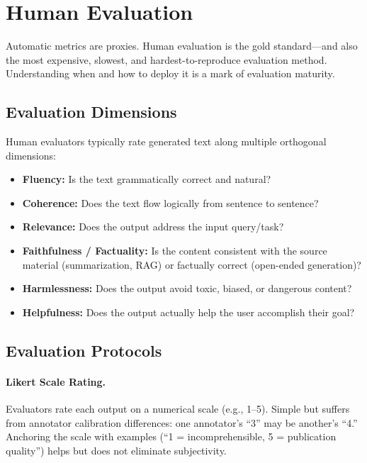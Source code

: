 \section{Human Evaluation}
\label{sec:human_eval}

Automatic metrics are proxies.  Human evaluation is the gold standard---and also
the most expensive, slowest, and hardest-to-reproduce evaluation method.
Understanding when and how to deploy it is a mark of evaluation maturity.

\subsection{Evaluation Dimensions}

Human evaluators typically rate generated text along multiple orthogonal
dimensions:

\begin{itemize}
    \item \textbf{Fluency:} Is the text grammatically correct and natural?
    \item \textbf{Coherence:} Does the text flow logically from sentence to
          sentence?
    \item \textbf{Relevance:} Does the output address the input query/task?
    \item \textbf{Faithfulness / Factuality:} Is the content consistent with the
          source material (summarization, RAG) or factually correct (open-ended
          generation)?
    \item \textbf{Harmlessness:} Does the output avoid toxic, biased, or
          dangerous content?
    \item \textbf{Helpfulness:} Does the output actually help the user accomplish
          their goal?
\end{itemize}

\subsection{Evaluation Protocols}

\paragraph{Likert Scale Rating.}
Evaluators rate each output on a numerical scale (e.g., 1--5).  Simple but
suffers from annotator calibration differences: one annotator's ``3'' may be
another's ``4.''  Anchoring the scale with examples (``1 = incomprehensible,
5 = publication quality'') helps but does not eliminate subjectivity.

